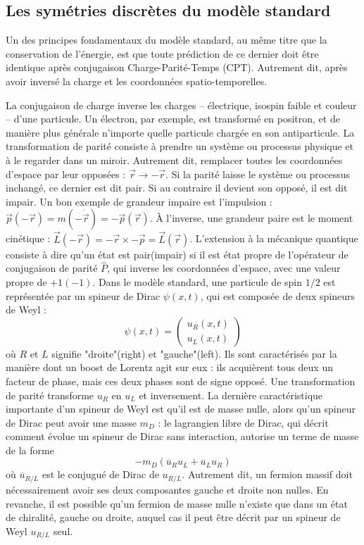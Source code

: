 		\subsection{Les symétries discrètes du modèle standard}\label{sec::CP}
		
			Un des principes fondamentaux du modèle standard, au même titre que la conservation de l'énergie, est que toute prédiction de ce dernier doit être identique après conjugaison Charge-Parité-Temps (CPT). Autrement dit, après avoir inversé la charge et les coordonnées spatio-temporelles.
			
			La conjugaison de charge inverse les charges -- électrique, isospin faible et couleur -- d'une particule. Un électron, par exemple, est transformé en positron, et de manière plus générale n'importe quelle particule chargée en son antiparticule. La transformation de parité consiste à prendre un système ou processus physique  et à le regarder dans un miroir. Autrement dit, remplacer toutes les coordonnées d'espace par leur opposées : $\Vec{r}\to-\Vec{r}$. Si la parité laisse le système ou processus inchangé, ce dernier est dit pair. Si au contraire il devient son opposé, il est dit impair. Un bon exemple de grandeur impaire est l'impulsion : $\Vec{p}(-\Vec{r}) = m(-\dot{\Vec{r}}) = -\Vec{p}(\Vec{r})$. À l'inverse, une grandeur paire est le moment cinétique : $\Vec{L}(-\Vec{r}) = -\Vec{r}\times -\Vec{p} = \Vec{L}(\Vec{r})$. L'extension à la mécanique quantique consiste à dire qu'un état est pair(impair) si il est état propre de l'opérateur de conjugaison de parité $\hat{P}$, qui inverse les coordonnées d'espace, avec une valeur propre de $+1(-1)$. Dans le modèle standard, une particule de spin $1/2$ est représentée par un spineur de Dirac $\psi(x,t)$, qui est composée de deux spineurs de Weyl :
			\begin{equation}
			\psi(x,t)=\left(\begin{matrix} u_R(x,t) \\ u_L(x,t)\end{matrix}\right)
			\end{equation}
			où $R$ et $L$ signifie "droite"(right) et "gauche"(left). Ils sont caractérisés par la manière dont un boost de Lorentz agit sur eux : ils acquièrent tous deux un facteur de phase, mais ces deux phases sont de signe opposé. Une transformation de parité transforme $u_R$ en $u_L$ et inversement. La dernière caractéristique importante d'un spineur de Weyl est qu'il est de masse nulle, alors qu'un spineur de Dirac peut avoir une masse $m_D$ : le lagrangien libre de Dirac, qui décrit comment évolue un spineur de Dirac sans interaction, autorise un terme de masse de la forme
			\begin{equation}\label{eq::dirac_mass}
			-m_D(\overline{u}_R u_L + \overline{u}_L u_R)
			\end{equation}
			où $\overline{u}_{R/L}$ est le conjugué de Dirac de $u_{R/L}$. Autrement dit, un fermion massif doit nécessairement avoir ses deux composantes gauche et droite non nulles. En revanche, il est possible qu'un fermion de masse nulle n'existe que dans un état de chiralité, gauche ou droite, auquel cas il peut être décrit par un spineur de Weyl $u_{R/L}$ seul. 
			
